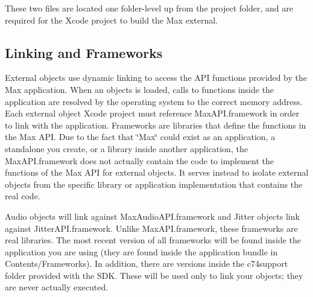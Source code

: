 These two files are located one folder-\/level up from the project folder, and are required for the Xcode project to build the Max external.\hypertarget{chapter_platform_chapter_platform_mac_linking}{}\subsection{Linking and Frameworks}\label{chapter_platform_chapter_platform_mac_linking}
External objects use dynamic linking to access the API functions provided by the Max application. When an objects is loaded, calls to functions inside the application are resolved by the operating system to the correct memory address. Each external object Xcode project must reference MaxAPI.framework in order to link with the application. Frameworks are libraries that define the functions in the Max API. Due to the fact that \char`\"{}Max\char`\"{} could exist as an application, a standalone you create, or a library inside another application, the MaxAPI.framework does not actually contain the code to implement the functions of the Max API for external objects. It serves instead to isolate external objects from the specific library or application implementation that contains the real code.

Audio objects will link against MaxAudioAPI.framework and Jitter objects link against JitterAPI.framework. Unlike MaxAPI.framework, these frameworks are real libraries. The most recent version of all frameworks will be found inside the application you are using (they are found inside the application bundle in Contents/Frameworks). In addition, there are versions inside the c74support folder provided with the SDK. These will be used only to link your objects; they are never actually executed.

